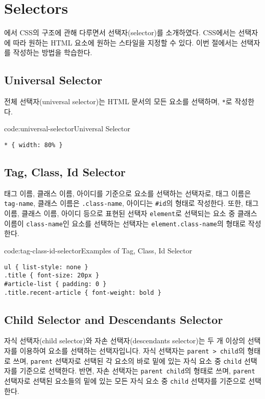 \section{Selectors} \label{sect:selectors}

에서 CSS의 구조에 관해 다루면서 선택자(selector)를 소개하였다. CSS에서는 선택자에 따라 원하는 HTML 요소에 원하는 스타일을 지정할 수 있다. 이번 절에서는 선택자를 작성하는 방법을 학습한다.

\subsection*{Universal Selector}

전체 선택자(universal selector)는 HTML 문서의 모든 요소를 선택하며, \texttt{*}로 작성한다.

\begin{codeenv}{code:universal-selector}{Universal Selector}\begin{verbatim}
* { width: 80% }
\end{verbatim}
\end{codeenv}

\subsection*{Tag, Class, Id Selector}
태그 이름, 클래스 이름, 아이디를 기준으로 요소를 선택하는 선택자로, 태그 이름은 \texttt{tag-name}, 클래스 이름은 \texttt{.class-name}, 아이디는 \texttt{\#id}의 형태로 작성한다. 또한, 태그 이름, 클래스 이름, 아이디 등으로 표현된 선택자 \texttt{element}로 선택되는 요소 중 클래스 이름이 \texttt{class-name}인 요소를 선택하는 선택자는 \texttt{element.class-name}의 형태로 작성한다.

\begin{codeenv}{code:tag-class-id-selector}{Examples of Tag, Class, Id Selector}\begin{verbatim}
ul { list-style: none }
.title { font-size: 20px }
#article-list { padding: 0 }
.title.recent-article { font-weight: bold }
\end{verbatim}
\end{codeenv}

\subsection*{Child Selector and Descendants Selector}
자식 선택자(child selector)와 자손 선택자(descendants selector)는 두 개 이상의 선택자를 이용하여 요소를 선택하는 선택자입니다. 자식 선택자는 \texttt{parent > child}의 형태로 쓰며, \texttt{parent} 선택자로 선택된 각 요소의 바로 밑에 있는 자식 요소 중 \texttt{child} 선택자를 기준으로 선택한다. 반면, 자손 선택자는 \texttt{parent child}의 형태로 쓰며, \texttt{parent} 선택자로 선택된 요소들의 밑에 있는 모든 자식 요소 중 \texttt{child} 선택자를 기준으로 선택한다.

